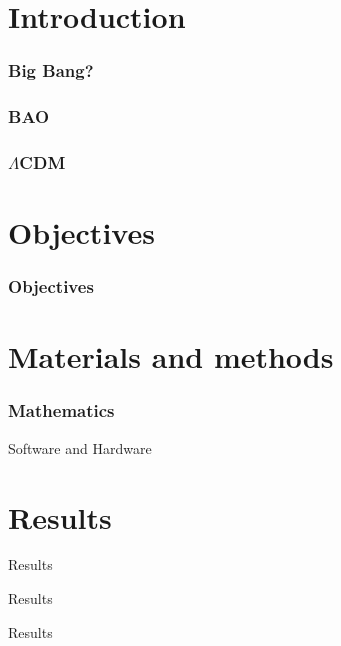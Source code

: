 \documentclass{beamer}
\begin{document}
\section{Introduction}
\begin{frame}[allowframebreaks]
\frametitle{Big Bang?}
\end{frame}

\begin{frame}[allowframebreaks]
\frametitle{BAO}
\end{frame}


\begin{frame}[allowframebreaks]
\frametitle{$\Lambda$CDM}
\end{frame}




\section{Objectives}
\begin{frame}[allowframebreaks]
\frametitle{Objectives}
\end{frame}

\section{Materials and methods}
\begin{frame}[allowframebreaks]
\frametitle{Mathematics}
\end{frame}



\begin{frame}{Software and Hardware}

\end{frame}

\section{Results}
\begin{frame}{Results}
	 
\end{frame}
\begin{frame}{Results}
	 
\end{frame}
\begin{frame}{Results}
	 
\end{frame}
\end{document}
